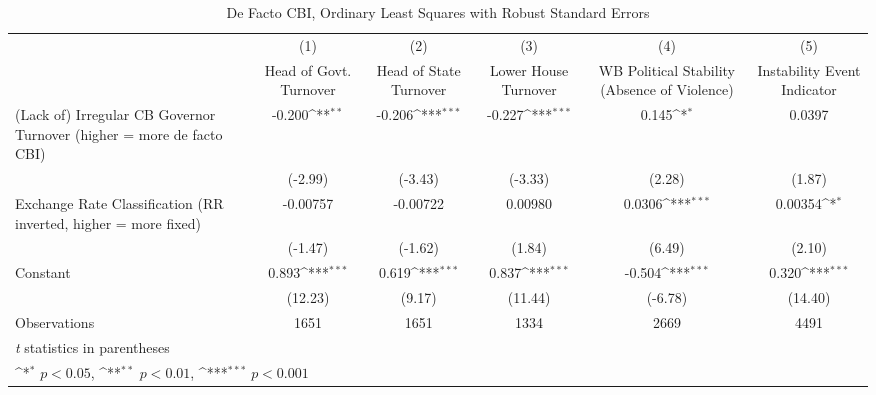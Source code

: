 \begin{table}[htbp]\centering
\def\sym#1{\ifmmode^{#1}\else\(^{#1}\)\fi}
\caption{De Facto CBI, Ordinary Least Squares with Robust Standard Errors \label{multIndOLSDJ}}
\begin{tabular*}{\linewidth}{@{\hskip\tabcolsep\extracolsep\fill}l*{5}{c}}
\toprule
                &\multicolumn{1}{c}{(1)}&\multicolumn{1}{c}{(2)}&\multicolumn{1}{c}{(3)}&\multicolumn{1}{c}{(4)}&\multicolumn{1}{c}{(5)}\\
                &\multicolumn{1}{c}{Head of Govt. Turnover}&\multicolumn{1}{c}{Head of State Turnover}&\multicolumn{1}{c}{Lower House Turnover}&\multicolumn{1}{c}{WB Political Stability (Absence of Violence)}&\multicolumn{1}{c}{Instability Event Indicator}\\
\midrule
(Lack of) Irregular CB Governor Turnover (higher = more de facto CBI)&   -0.200\sym{**} &   -0.206\sym{***}&   -0.227\sym{***}&    0.145\sym{*}  &   0.0397         \\
                &  (-2.99)         &  (-3.43)         &  (-3.33)         &   (2.28)         &   (1.87)         \\
\addlinespace
Exchange Rate Classification (RR inverted, higher = more fixed)& -0.00757         & -0.00722         &  0.00980         &   0.0306\sym{***}&  0.00354\sym{*}  \\
                &  (-1.47)         &  (-1.62)         &   (1.84)         &   (6.49)         &   (2.10)         \\
\addlinespace
Constant        &    0.893\sym{***}&    0.619\sym{***}&    0.837\sym{***}&   -0.504\sym{***}&    0.320\sym{***}\\
                &  (12.23)         &   (9.17)         &  (11.44)         &  (-6.78)         &  (14.40)         \\
\midrule
Observations    &     1651         &     1651         &     1334         &     2669         &     4491         \\
\bottomrule
\multicolumn{6}{l}{\footnotesize \textit{t} statistics in parentheses}\\
\multicolumn{6}{l}{\footnotesize \sym{*} \(p<0.05\), \sym{**} \(p<0.01\), \sym{***} \(p<0.001\)}\\
\end{tabular*}
\end{table}
